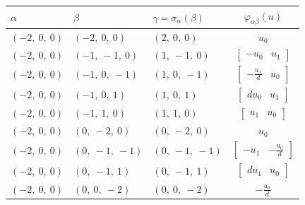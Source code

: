 \documentclass[11pt]{article}
\newcommand{\noi}{\noindent}
\theoremstyle{definition}
\begin{document}
\bigskip

\noi \noindent \begin{longtable}{|l|l|l|c|}
    \hline
    \textbf{$\alpha$} & \textbf{$\beta$} & \textbf{$\gamma = \sigma_{\alpha}(\beta)$} & $\varphi_{\alpha\beta}(u)$ \\
    \hline
    \endhead
    $\left( -2, \  0, \  0\right)$ & $\left( -2, \  0, \  0\right)$ & $\left( 2, \  0, \  0\right)$ & $u_{0}$ \\
    \hline
    $\left( -2, \  0, \  0\right)$ & $\left( -1, \  -1, \  0\right)$ & $\left( 1, \  -1, \  0\right)$ & $\left[\begin{matrix}- u_{0} & u_{1}\end{matrix}\right]$ \\
    \hline
    $\left( -2, \  0, \  0\right)$ & $\left( -1, \  0, \  -1\right)$ & $\left( 1, \  0, \  -1\right)$ & $\left[\begin{matrix}- \frac{u_{1}}{d} & u_{0}\end{matrix}\right]$ \\
    \hline
    $\left( -2, \  0, \  0\right)$ & $\left( -1, \  0, \  1\right)$ & $\left( 1, \  0, \  1\right)$ & $\left[\begin{matrix}d u_{0} & u_{1}\end{matrix}\right]$ \\
    \hline
    $\left( -2, \  0, \  0\right)$ & $\left( -1, \  1, \  0\right)$ & $\left( 1, \  1, \  0\right)$ & $\left[\begin{matrix}u_{1} & u_{0}\end{matrix}\right]$ \\
    \hline
    $\left( -2, \  0, \  0\right)$ & $\left( 0, \  -2, \  0\right)$ & $\left( 0, \  -2, \  0\right)$ & $u_{0}$ \\
    \hline
    $\left( -2, \  0, \  0\right)$ & $\left( 0, \  -1, \  -1\right)$ & $\left( 0, \  -1, \  -1\right)$ & $\left[\begin{matrix}- u_{1} & - \frac{u_{0}}{d}\end{matrix}\right]$ \\
    \hline
    $\left( -2, \  0, \  0\right)$ & $\left( 0, \  -1, \  1\right)$ & $\left( 0, \  -1, \  1\right)$ & $\left[\begin{matrix}d u_{1} & u_{0}\end{matrix}\right]$ \\
    \hline
    $\left( -2, \  0, \  0\right)$ & $\left( 0, \  0, \  -2\right)$ & $\left( 0, \  0, \  -2\right)$ & $- \frac{u_{0}}{d}$ \\

\end{longtable}
\end{document}
